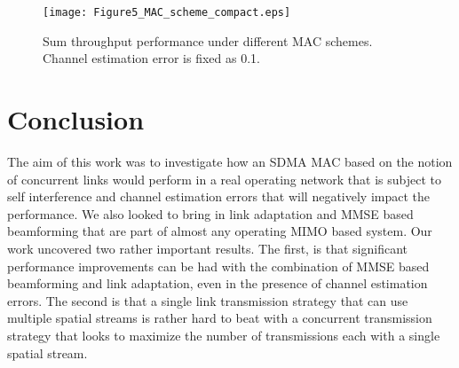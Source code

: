 \documentclass[journal, final]{IEEEtran}
\begin{document}
\begin{figure}
\centering
\texttt{[image: Figure5\_MAC\_scheme\_compact.eps]}
\caption{Sum throughput performance under different MAC schemes. Channel estimation error is fixed as 0.1.}
\label{Fig5_MAC_scheme}
\end{figure}

\section{Conclusion}

The aim of this work was to investigate how an SDMA MAC based on the notion of concurrent links would perform in a real operating network that is subject to self interference and channel estimation errors that will negatively impact the performance. We also looked to bring in link adaptation and MMSE based beamforming that are part of almost any operating MIMO based system. Our work uncovered two rather important results. The first, is that significant performance improvements can be had with the combination of MMSE based beamforming and link adaptation, even in the presence of channel estimation errors. The second
is that a single link transmission strategy that can use multiple spatial streams is rather hard to beat with a concurrent transmission strategy that looks to maximize the number of transmissions each with a single spatial stream.





















\ifCLASSOPTIONcaptionsoff
  \newpage
\fi















\end{document}

